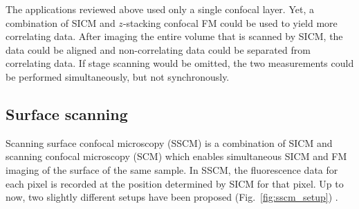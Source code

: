 The applications reviewed above used only a single confocal layer. Yet,
a combination of SICM and $z$-stacking confocal FM could be used to yield more
correlating data. After imaging the entire volume that is scanned by SICM, the
data could be aligned and non-correlating data could be separated from
correlating data. If stage scanning would be omitted, the two measurements
could be performed simultaneously, but not synchronously.  


%



\subsection{Surface scanning}

Scanning surface confocal microscopy (SSCM) \cite{Gorelik2002a} is a
combination of SICM and scanning confocal microscopy (SCM) which enables
simultaneous SICM and FM imaging of the surface of the same sample. In SSCM,
the fluorescence data for each pixel is recorded at the position determined by
SICM for that pixel. Up to now, two slightly different setups have been proposed
(Fig.~\ref{fig:sscm_setup}) \cite{Gorelik2002a,Shevchuk2013}.

